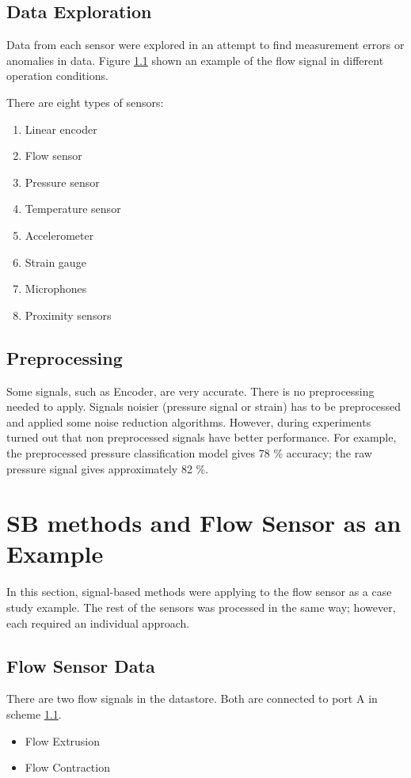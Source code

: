 \subsection{Data Exploration}
Data from each sensor were explored in an attempt to find measurement
errors or anomalies in data.  Figure \ref{} shown an example of the
flow signal in different operation conditions. 

There are eight types of sensors:
\begin{enumerate}
    \item Linear encoder
    \item Flow sensor
    \item Pressure sensor
    \item Temperature sensor
    \item Accelerometer
    \item Strain gauge
    \item Microphones
    \item Proximity sensors
\end{enumerate}

\subsection{Preprocessing}
Some signals, such as Encoder, are very accurate. There is no preprocessing
needed to apply. Signals noisier (pressure signal or strain) has to be
preprocessed and applied some noise reduction algorithms. However, during
experiments turned out that non preprocessed signals have better
performance. For example, the preprocessed pressure classification model
gives 78 \% accuracy; the raw pressure signal gives approximately 82 \%.

\section{SB methods and Flow Sensor as an Example}
In this section, signal-based methods were applying to the flow sensor as a
case study example.  The rest of the sensors was processed in the same way;
however, each required an individual approach.

\subsection{Flow Sensor Data}
There are two flow signals in the datastore. Both are connected to port A
in scheme \ref{}.
\begin{itemize}
    \item Flow Extrusion
    \item Flow Contraction
\end{itemize}

